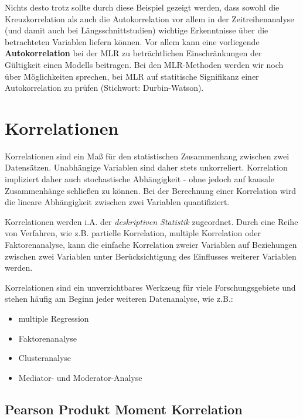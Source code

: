 \documentclass[]{article}
\providecommand{\tightlist}{%
  \setlength{\itemsep}{0pt}\setlength{\parskip}{0pt}}
\begin{document}
Nichts desto trotz sollte durch diese Beispiel gezeigt werden, dass sowohl die Kreuzkorrelation als auch die Autokorrelation vor allem in der Zeitreihenanalyse (und damit auch bei Längsschnittstudien) wichtige Erkenntnisse über die betrachteten Variablen liefern können. Vor allem kann eine vorliegende \textbf{Autokorrelation} bei der MLR zu beträchtlichen Einschränkungen der Gültigkeit einen Modells beitragen. Bei den MLR-Methoden werden wir noch über Möglichkeiten sprechen, bei MLR auf statitische Signifikanz einer Autokorrelation zu prüfen (Stichwort: Durbin-Watson).

\hypertarget{korrelationen}{%
\section*{Korrelationen}\label{korrelationen}}

Korrelationen sind ein Maß für den statistischen Zusammenhang zwischen zwei Datensätzen. Unabhängige Variablen sind daher stets unkorreliert. Korrelation impliziert daher auch stochastische Abhängigkeit - ohne jedoch auf kausale Zusammenhänge schließen zu können. Bei der Berechnung einer Korrelation wird die lineare Abhängigkeit zwischen zwei Variablen quantifiziert.

Korrelationen werden i.A. der \emph{deskriptiven Statistik} zugeordnet. Durch eine Reihe von Verfahren, wie z.B. partielle Korrelation, multiple Korrelation oder Faktorenanalyse, kann die einfache Korrelation zweier Variablen auf Beziehungen zwischen zwei Variablen unter Berücksichtigung des Einflusses weiterer Variablen werden.

Korrelationen sind ein unverzichtbares Werkzeug für viele Forschungsgebiete und stehen häufig am Beginn jeder weiteren Datenanalyse, wie z.B.:

\begin{itemize}
\tightlist
\item
  multiple Regression
\item
  Faktorenanalyse
\item
  Clusteranalyse
\item
  Mediator- und Moderator-Analyse
\end{itemize}

\hypertarget{pearson-produkt-moment-korrelation}{%
\subsection*{Pearson Produkt Moment Korrelation}\label{pearson-produkt-moment-korrelation}}
\end{document}
